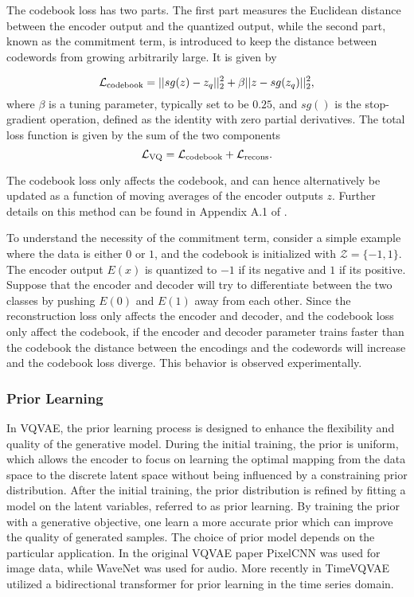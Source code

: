 \documentclass[../../thesis.tex]{subfiles}
\begin{document}
The codebook loss has two parts. The first part measures the Euclidean distance between the encoder output and the quantized output, while the second part, known as the commitment term, is introduced to keep the distance between codewords from growing arbitrarily large. It is given by 

\begin{equation}
    \mathcal{L}_{\text{codebook}} = ||sg(z) - z_q||_2^2 +\beta||z - sg(z_q)||_2^2,
\end{equation}
where $\beta$ is a tuning parameter, typically set to be $0.25$, and $sg()$ is the stop-gradient operation, defined as the identity with zero partial derivatives. The total loss function is given by the sum of the two components
    \begin{equation}     
        \label{eq:VQVAELoss}
            \mathcal{L}_{\text{VQ}} = \mathcal{L}_{\text{codebook}} + \mathcal{L}_{\text{recons}}.
    \end{equation}

The codebook loss only affects the codebook, and can hence alternatively be updated as a function of moving averages of the encoder outputs $z$. Further details on this method can be found in Appendix A.1 of \cite{VQVAE}.\newline 

To understand the necessity of the commitment term, consider a simple example where the data is either $0$ or $1$, and the codebook is initialized with $\mathcal{Z} = \{-1,1\}$. The encoder output $E(x)$ is quantized to $-1$ if its negative and $1$ if its positive. Suppose that the encoder and decoder will try to differentiate between the two classes by pushing $E(0)$ and $E(1)$ away from each other. Since the reconstruction loss only affects the encoder and decoder, and the codebook loss only affect the codebook, if the encoder and decoder parameter trains faster than the codebook the distance between the encodings and the codewords will increase and the codebook loss diverge. This behavior is observed experimentally.

\subsubsection{Prior Learning}
In VQVAE, the prior learning process is designed to enhance the flexibility and quality of the generative model. During the initial training, the prior is uniform, which allows the encoder to focus on learning the optimal mapping from the data space to the discrete latent space without being influenced by a constraining prior distribution. After the initial training, the prior distribution is refined by fitting a model on the latent variables, referred to as prior learning. By training the prior with a generative objective, one learn a more accurate prior which can improve the quality of generated samples. The choice of prior model depends on the particular application. In the original VQVAE paper PixelCNN \cite{oord2016pixel} was used for image data, while WaveNet \cite{oord2016wavenet} was used for audio. More recently in TimeVQVAE \cite{TimeVQVAE} utilized a bidirectional transformer \cite{chang2022maskgit} for prior learning in the time series domain. 
\end{document}
